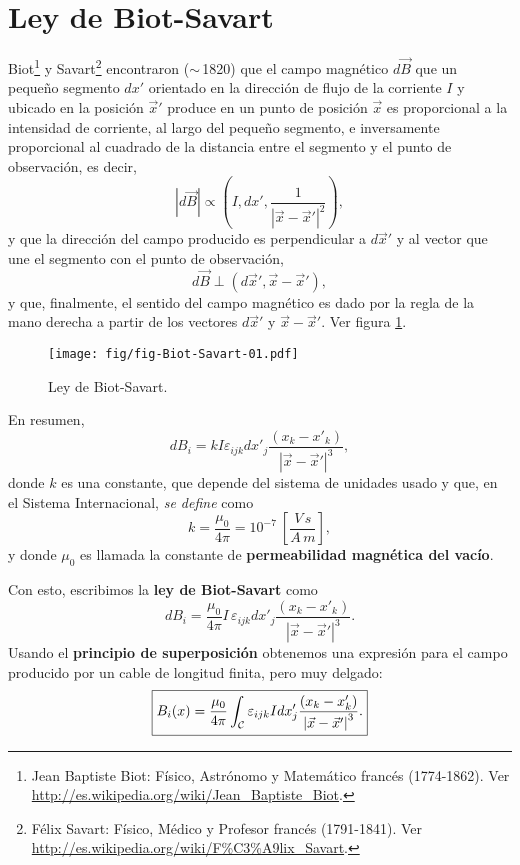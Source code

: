 \section{Ley de Biot-Savart}
Biot\footnote{Jean Baptiste Biot: Físico, Astrónomo y Matemático francés (1774-1862). Ver \url{http://es.wikipedia.org/wiki/Jean_Baptiste_Biot}.} y Savart\footnote{Félix Savart: Físico, Médico y Profesor francés (1791-1841). Ver \url{http://es.wikipedia.org/wiki/F\%C3\%A9lix_Savart}.} encontraron ($\sim$\,1820) que el campo magnético $d\vec{B}$ que un pequeño segmento $dx'$ orientado en la dirección de flujo de la corriente $I$ y ubicado en la posición $\vec{x}'$ produce en un punto de posición $\vec{x}$ es proporcional a la intensidad de corriente, al largo del
pequeño segmento, e inversamente proporcional al cuadrado de la distancia
entre el segmento y el punto de observación, es decir,
\begin{equation}
 \left\vert d\vec{B}\right\vert \propto
\left(I,dx',\frac{1}{\left|\vec{x}-\vec{x}'\right|^2}\right),
\end{equation}
y que la dirección del campo producido es perpendicular a $d\vec{x}'$ y al
vector que une el segmento con el punto de observación,
\begin{equation}
d\vec{B}  \perp\left(  d\vec{x}', \vec{x}-\vec{x}' \right) ,
\end{equation}
y que, finalmente, el sentido del campo magnético es dado por la regla de la mano derecha a partir de los vectores $d\vec{x}'$ y $\vec{x}-\vec{x}'$. Ver figura \ref{fBS1}. 
\begin{figure}[!h]
\centerline{\texttt{[image: fig/fig-Biot-Savart-01.pdf]}}
\label{Esquema para la ley de Biot-Savart.}
\label{fBS1}
\caption{Ley de Biot-Savart.}
\end{figure}
En resumen,
\begin{equation}
dB_i=kI\varepsilon_{ijk}dx'_j\frac{\left(x_k-x'_k\right)}{\left\vert
\vec{x}-\vec{x}'\right\vert^3},
\end{equation}
donde $k$ es una constante, que depende del sistema de unidades usado y que,
en el Sistema Internacional, \textit{se define} como
\begin{equation}
k=\frac{\mu_0}{4\pi}=10^{-7}~\left[  \frac{V\,s}{A\,m}\right],
\end{equation}
y donde $\mu_0$ es llamada la constante de \textbf{permeabilidad magnética del vacío}.

Con esto, escribimos la \textbf{ley de Biot-Savart} como
\begin{equation}
dB_i=\frac{\mu_0}{4\pi}I\,\varepsilon_{ijk}dx'_j\frac{\left(x_k-x'_k\right)}
{\left\vert \vec{x}-\vec{x}'\right\vert ^3}.
\end{equation}
Usando el \textbf{principio de superposición} obtenemos una expresión para el campo producido por un cable de longitud finita, pero muy delgado:
\begin{equation}
\boxed{B_i(x)=\frac{\mu_0}{4\pi}\int_{\cal C}\varepsilon_{ijk}Idx'_j
\frac{\left(x_k-x'_k\right)}{\left\vert\vec{x}-\vec{x}'\right\vert^3}.}
\label{BS1}
\end{equation}

